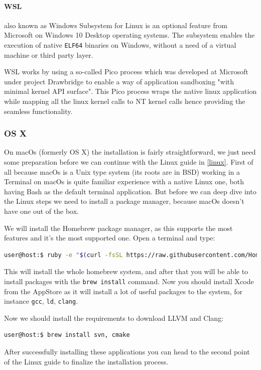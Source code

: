 \paragraph{WSL}
\par also known as Windows Subsystem for Linux is an optional feature from Microsoft on Windows 10 Desktop operating systems. The subsystem enables the execution of native \verb|ELF64| binaries\cite{wsl_overview} on Windows, without a need of a virtual machine or third party layer. \medskip
\par WSL works by using a so-called Pico process which was developed at Microsoft under project Drawbridge\cite{project_drawbridge} to enable a way of application sandboxing "with minimal kernel API surface"\cite{project_drawbridge}. This Pico process wraps the native linux application while mapping all the linux kernel calls to NT kernel calls hence providing the seamless functionality. 
\par 
\subsubsection{OS X}
\par On macOs (formerly OS X) the installation is fairly straightforward, we just need some preparation before we can continue with the Linux guide in \ref{linux}. First of all because macOs is a Unix type system (its roots are in BSD) working in a Terminal on macOs is quite familiar experience with a native Linux one, both having Bash as the default terminal application. But before we can deep dive into the Linux steps we need to install a package manager, because macOs doesn't have one out of the box.
\par We will install the Homebrew\cite{homebrew_homepage} package manager, as this supports the most features and it's the most supported one. Open a terminal and type: 
\begin{lstlisting}[language=bash, frame=single]
user@host:$ ruby -e "$(curl -fsSL https://raw.githubusercontent.com/Homebrew/install/master/install)"
\end{lstlisting}
\par This will install the whole homebrew system, and after that you will be able to install packages with the \verb|brew install| command. Now you should install Xcode from the AppStore as it will install a lot of useful packages to the system, for instance \verb|gcc|, \verb|ld|, \verb|clang|.
\par Now we should install the requirements to download LLVM and Clang:
\begin{lstlisting}[language=bash, frame=single]
user@host:$ brew install svn, cmake
\end{lstlisting}
\par After successfully installing these applications you can head to the second point of the Linux guide to finalize the installation process.
